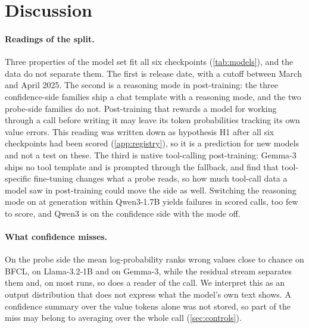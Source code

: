 \section{Discussion}
\label{sec:discussion}

\paragraph{Readings of the split.}
Three properties of the model set fit all six checkpoints (\cref{tab:models}), and the data do not separate them. The first is release date, with a cutoff between March and April 2025. The second is a reasoning mode in post-training: the three confidence-side families ship a chat template with a reasoning mode, and the two probe-side families do not. Post-training that rewards a model for working through a call before writing it may leave its token probabilities tracking its own value errors. This reading was written down as hypothesis H1 after all six checkpoints had been scored (\cref{app:registry}), so it is a prediction for new models and not a test on these. The third is native tool-calling post-training: Gemma-3 ships no tool template and is prompted through the fallback, and \citet{yeats2026calls} find that tool-specific fine-tuning changes what a probe reads, so how much tool-call data a model saw in post-training could move the side as well. Switching the reasoning mode on at generation within Qwen3-1.7B yields \thinkPos{} failures in \thinkScored{} scored calls, too few to score, and Qwen3 is on the confidence side with the mode off.

\paragraph{What confidence misses.}
On the probe side the mean log-probability ranks wrong values close to chance on BFCL, \aucConfWavLlamaOneBBfcl{} on Llama-3.2-1B and \aucConfWavGemmaBfcl{} on Gemma-3, while the residual stream separates them and, on most runs, so does a reader of the call. We interpret this as an output distribution that does not express what the model's own text shows. A confidence summary over the value tokens alone was not stored, so part of the miss may belong to averaging over the whole call (\cref{sec:controls}).

